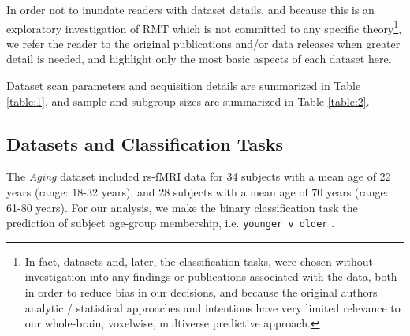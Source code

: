 \documentclass[12pt]{spieman}  %
\newcommand{\code}[1]{\small \texttt{#1} \normalsize}
\begin{document}
\begin{spacing}{2}
In order not to inundate readers with dataset details, and because this is an
exploratory investigation of RMT which is not committed to any specific
theory\footnote{In fact, datasets and, later, the classification tasks, were
chosen without investigation into any findings or publications associated with
the data, both in order to reduce bias in our decisions, and because the
original authors analytic / statistical approaches and intentions have very
limited relevance to our whole-brain, voxelwise, multiverse predictive
approach.}, we refer the reader to the original publications and/or data
releases when greater detail is needed, and highlight only the most basic
aspects of each dataset here.

Dataset scan parameters and acquisition details are summarized in Table
\ref{table:1}, and sample and subgroup sizes are summarized in Table
\ref{table:2}.

\subsection{Datasets and Classification Tasks}


The \textit{Aging} dataset\cite{wahlheimIntrinsicFunctionalConnectivity2021}
included rs-fMRI data for 34 subjects with a mean age of 22 years (range: 18-32
years), and 28 subjects with a mean age of 70 years (range: 61-80 years). For
our analysis, we make the binary classification task the prediction of subject
age-group membership, i.e. \code{younger v older}.



\end{spacing}
\end{document}
